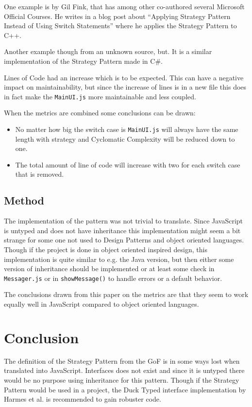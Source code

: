 \documentclass[conference, a4paper]{IEEEtran}
\begin{document}
One example is by Gil Fink, that has among other co-authored several Microsoft Official Courses. He writes in a blog post about ``Applying Strategy Pattern Instead of Using Switch Statements'' where he applies the Strategy Pattern to C++.~\cite{bibitem:GilFink}

Another example though from an unknown source, but. It is a similar implementation of the Strategy Pattern made in C\#.~\cite{bibitem:CSharp}

Lines of Code had an increase which is to be expected. This can have a negative impact on maintainability, but since the increase of lines is in a new file this does in fact make the \texttt{MainUI.js} more maintainable and less coupled.

When the metrics are combined some conclusions can be drawn:
\begin{itemize}
	\item No matter how big the switch case is \texttt{MainUI.js} will always have the same length with strategy and Cyclomatic Complexity will be reduced down to one.
	\item The total amount of line of code will increase with two for each switch case that is removed.
\end{itemize}

\subsection{Method}
The implementation of the pattern was not trivial to translate. Since JavaScript is untyped and does not have inheritance this implementation might seem a bit strange for some one not used to Design Patterns and object oriented languages. Though if the project is done in object oriented inspired design, this implementation is quite similar to e.g. the Java version, but then either some version of inheritance should be implemented or at least some check in \texttt{Messager.js} or in \texttt{showMessage()} to handle errors or a default behavior.

The conclusions drawn from this paper on the metrics are that they seem to work equally well in JavaScript compared to object oriented languages.

\section{Conclusion}
The definition of the Strategy Pattern from the GoF is in some ways lost when translated into JavaScript. Interfaces does not exist and since it is untyped there would be no purpose using inheritance for this pattern. Though if the Strategy Pattern would be used in a project, the Duck Typed interface implementation by Harmes et al. is recommended to gain robuster code.~\cite{bibitem:DiazHarmes}
\end{document}
